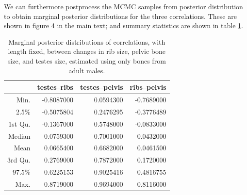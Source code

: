 \documentclass[12pt]{article}
\begin{document}
We can furthermore postprocess the MCMC samples from posterior distribution
to obtain marginal posterior distributions for the three correlations.
These are shown in figure 4 in the main text;
and summary statistics are shown in table \ref{tab:posterior_cors}.




\begin{table}[ht]
\centering
\begin{tabular}{rrrr}
  \hline
        &  testes--ribs & testes--pelvis & ribs--pelvis \\
  \hline
 Min. &     -0.8087000  &   0.0594300 & -0.7689000   \\
 2.5\% &    -0.5075804  &   0.2476295 & -0.3776489   \\
 1st Qu. &  -0.1367000  &   0.5748000 & -0.0833000   \\
 Median &    0.0759300  &   0.7001000 &  0.0432000   \\
 Mean &      0.0665400  &   0.6682000 &  0.0461500   \\
 3rd Qu. &   0.2769000  &   0.7872000 &  0.1720000   \\
 97.5\%  &   0.6225153  &   0.9025416 &  0.4816755   \\
 Max. &      0.8719000  &   0.9694000 &  0.8116000   \\
   \hline
\end{tabular}
  \caption{Marginal posterior distributions of correlations, with length fixed,
  between changes in rib size, pelvic bone size, and testes size,
  estimated using only bones from adult males.
  \label{tab:posterior_cors}
}
\end{table}
\end{document}
